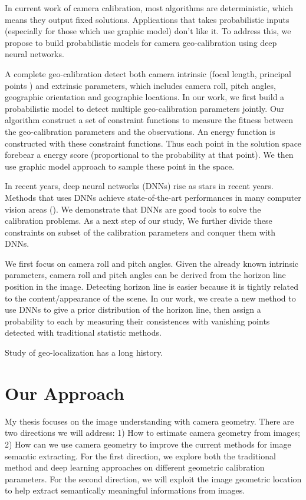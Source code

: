 In current work of camera calibration, most algorithms are
deterministic, which means they output fixed solutions. Applications
that takes probabilistic inputs (especially for those which use
graphic model) don't like it. To address this, we propose to build
probabilistic models for camera geo-calibration using deep neural
networks.

A complete geo-calibration detect both camera intrinsic (focal length,
principal points \etc) and extrinsic parameters, which includes camera
roll, pitch angles, geographic orientation and geographic locations.
In our work, we first build a probabilistic model to detect multiple
geo-calibration parameters jointly. Our algorithm construct a set of
constraint functions to measure the fitness between the
geo-calibration parameters and the observations. An energy function
is constructed with these constraint functions. Thus each point in the
solution space forebear a energy score (proportional to the
probability at that point). We then use graphic model approach to
sample these point in the space.

In recent years, deep neural networks (DNNs) rise as stars in recent
years. Methods that uses DNNs achieve state-of-the-art performances in
many computer vision areas (). We demonstrate that
DNNs are good tools to solve the calibration problems. 
As a next step of our study, We further
divide these constraints on subset of the calibration parameters and
conquer them with DNNs.

We first focus on camera roll and pitch angles. Given the already
known intrinsic parameters, camera roll and pitch angles can be
derived from the horizon line position in the image. Detecting horizon
line is easier because it is tightly related to the content/appearance
of the scene. In our work, we create a new method to use DNNs to give
a prior distribution of the horizon line, then assign a probability to
each by measuring their consistences with vanishing points detected
with traditional statistic methods.

Study of geo-localization has a long history. 


\section{Our Approach}
My thesis focuses on the image understanding with camera geometry.
There are two directions we will address: 1) How to estimate camera
geometry from images; 2) How can we use camera geometry to improve the
current methods for image semantic extracting. For the first direction,
we explore both the traditional method and deep learning approaches on
different geometric calibration parameters. For the second direction,
we will exploit the image geometric location to help extract
semantically meaningful informations from images.

